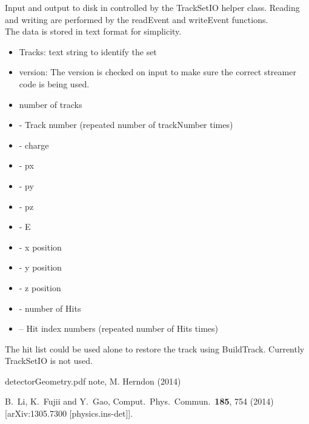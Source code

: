\documentclass[aps,prd,superscriptaddress,floatfix]{revtex4}
\begin{document}
Input and output to disk in controlled by the TrackSetIO helper class.  Reading and writing
are performed by the readEvent and writeEvent functions.
\\

The data is stored in text format for simplicity.

\begin{itemize}
\item Tracks: text string to identify the set
\item version: The version is checked on input to make sure the correct streamer code is being used.
\item number of tracks
\item - Track number (repeated number of trackNumber times)
\item - charge
\item - px
\item - py
\item - pz
\item - E
\item - x position
\item - y position
\item - z position
\item - number of Hits
\item -- Hit index numbers (repeated number of Hits times)
\end{itemize}

The hit list could be used alone to restore the track using BuildTrack.  Currently TrackSetIO is not used.

\begin{thebibliography}{99}

detectorGeometry.pdf note, M. Herndon (2014)

  B.~Li, K.~Fujii and Y.~Gao,
  Comput.\ Phys.\ Commun.\  {\bf 185}, 754 (2014)
  [arXiv:1305.7300 [physics.ins-det]].


\end{thebibliography}
% 
\end{document}
